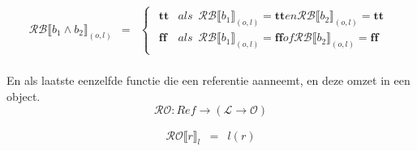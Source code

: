 \documentclass[12pt]{article}
\newcommand{\RB}{\mathcal{RB}}
\newcommand{\RO}{\mathcal{RO}}
\begin{document}
\[\begin{matrix}
\RB \llbracket b_1 \wedge b_2 \rrbracket_{(o,l)} & = &
\begin{cases}
\begin{matrix}
\boldsymbol{tt} & als \enspace \RB\llbracket b_1 \rrbracket_{(o,l)} = \boldsymbol{tt} en \RB \llbracket b_2 \rrbracket_{(o,l)} = \boldsymbol{tt}\\
\boldsymbol{ff} & als \enspace \RB\llbracket b_1 \rrbracket_{(o,l)} = \boldsymbol{ff} of \RB \llbracket b_2 \rrbracket_{(o,l)} = \boldsymbol{ff}
\end{matrix}
\end{cases}\\

\end{matrix}
\]

\pagebreak

En als laatste eenzelfde functie die een referentie aanneemt, en deze omzet in een object.
\[ \RO : Ref \rightarrow ( \mathcal{L} \rightarrow \mathcal{O}) \]

\[
\begin{matrix}
\RO \llbracket r \rrbracket_l & = & l(r)
\end{matrix}
\]
\end{document}
